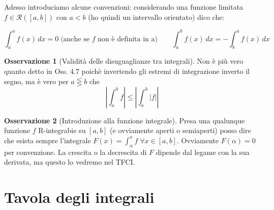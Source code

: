 \documentclass{article}
\theoremstyle{definition}
\theoremstyle{definition}
\theoremstyle{definition}
\theoremstyle{definition}
\newtheorem{remark}{Osservazione}[section]
\theoremstyle{definition}
\begin{document}
Adesso introduciamo alcune convenzioni: considerando una funzione limitata $f\in\mathcal{R}([a,b])$ con $a<b$ (ho quindi un intervallo orientato) dico che:

\[
    \int_a^a f(x) \, dx = 0 \; \text{(anche se $f$ non è definita in a)} \qquad \int_a^b f(x) \, dx = -\int_b^a f(x)\, dx    
\]

\begin{remark}[Validità delle disuguaglianze tra integrali]
    Non è più vero quanto detto in Oss. 4.7 poichè invertendo gli estremi di integrazione inverto il segno, ma è vero per $a \lesseqgtr b$ che 
    \[
        \left|\int_a^b f \right| \leq \left|\int_a^b \left| f \right| \right|
    \]
\end{remark}

\begin{remark}[Introduzione alla funzione integrale]
    Presa una qualunque funzione $f$ R-integrabie su $[a,b]$ (e ovviamente aperti o semiaperti) posso dire che esista sempre l'integrale $\displaystyle{F(x)=\int_\alpha^x f} \; \forall x \in [a,b]$. Ovviamente $F(\alpha)=0$ per convenzione. La crescita o la decrescita di $F$ dipende dal legame con la sua derivata, ma questo lo vedremo nel TFCI.
\end{remark}

\newpage
\section{Tavola degli integrali}
\end{document}
